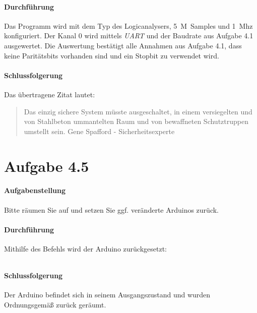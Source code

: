 \paragraph{Durchführung}
Das Programm wird mit dem Typ des Logicanalysers, \SI{5}{M Samples} und \SI{1}{Mhz} konfiguriert. Der Kanal 0 wird mittels \textit{UART} und der Baudrate aus Aufgabe 4.1 ausgewertet. Die Auswertung bestätigt alle Annahmen aus Aufgabe 4.1, dass keine Paritätsbits vorhanden sind und ein Stopbit zu verwendet wird.

\paragraph{Schlussfolgerung}
Das übertragene Zitat lautet:
\begin{quote}
	Das einzig sichere System müsste ausgeschaltet, in einem versiegelten und von Stahlbeton ummantelten Raum und von bewaffneten Schutztruppen umstellt sein. Gene Spafford - Sicherheitsexperte
\end{quote}





\newpage
\section{Aufgabe 4.5}
\paragraph{Aufgabenstellung}
Bitte räumen Sie auf und setzen Sie ggf. veränderte Arduinos zurück.

\paragraph{Durchführung}
Mithilfe des Befehls wird der Arduino zurückgesetzt:

\inputminted[breaklines, fontsize=\fontsize{10pt}{10pt}]{bash}{../docs/reset-dmx.txt}

\paragraph{Schlussfolgerung}
Der Arduino befindet sich in seinem Ausgangszustand und wurden Ordnungsgemäß zurück geräumt.